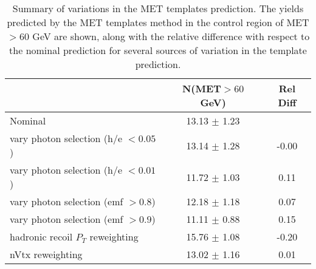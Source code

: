 \begin{table}[hbt]
\begin{center}
\caption{\label{tab:templatesyst} Summary of variations in the MET templates prediction. The yields 
predicted
by the MET templates method in the 
control region of MET$>60$ GeV 
are shown, along with the 
relative difference with respect to the nominal prediction for several sources of variation in the 
template prediction.}
\begin{tabular}{l|cc}
\hline
                                      & N(MET$>60$ GeV)   & Rel Diff    \\
\hline

Nominal                               &  13.13  $\pm$   1.23  &         \\
vary photon selection (h/e $<0.05$)   &  13.14  $\pm$   1.28  &  -0.00  \\
vary photon selection (h/e $<0.01$)   &  11.72  $\pm$   1.03  &   0.11  \\
vary photon selection (emf $>0.8$)    &  12.18  $\pm$   1.18  &   0.07  \\
vary photon selection (emf $>0.9$)    &  11.11  $\pm$   0.88  &   0.15  \\
hadronic recoil $P_T$ reweighting     &  15.76  $\pm$   1.08  &  -0.20  \\
nVtx reweighting                      &  13.02  $\pm$   1.16  &   0.01  \\



\end{tabular}
\end{center}
\end{table}
